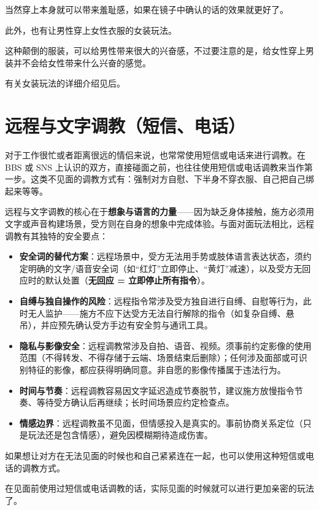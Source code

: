\documentclass[12pt,UTF8]{ctexbook}
\begin{document}
当然穿上本身就可以带来羞耻感，如果在镜子中确认的话的效果就更好了。

此外，也有让男性穿上女性衣服的女装玩法。

这种颠倒的服装，可以给男性带来很大的兴奋感，不过要注意的是，给女性穿上男装并不会给女性带来什么兴奋的感觉。

有关女装玩法的详细介绍见后。

\section{远程与文字调教（短信、电话）}

对于工作很忙或者距离很远的情侣来说，也常常使用短信或电话来进行调教。在 BBS 或 SNS 上认识的双方，直接碰面之前，也往往使用短信或电话调教来当作第一步。这类不见面的调教方式有：强制对方自慰、下半身不穿衣服、自己把自己绑起来等等。

远程与文字调教的核心在于\textbf{想象与语言的力量}——因为缺乏身体接触，施方必须用文字或声音构建场景，受方则在自身的想象中完成体验。与面对面玩法相比，远程调教有其独特的安全要点：

\begin{itemize}
\item \textbf{安全词的替代方案}：远程场景中，受方无法用手势或肢体语言表达状态，须约定明确的文字/语音安全词（如“红灯”立即停止、“黄灯”减速），以及受方无回应时的默认处置（\textbf{无回应 = 立即停止所有指令}）。
\item \textbf{自缚与独自操作的风险}：远程指令常涉及受方独自进行自缚、自慰等行为，此时无人监护——施方不应下达受方无法自行解除的指令（如复杂自缚、悬吊），并应预先确认受方手边有安全剪与通讯工具。
\item \textbf{隐私与影像安全}：远程调教常涉及自拍、语音、视频。须事前约定影像的使用范围（不得转发、不得存储于云端、场景结束后删除）；任何涉及面部或可识别特征的影像，都应获得明确同意。非自愿的影像传播属于违法行为。
\item \textbf{时间与节奏}：远程调教容易因文字延迟造成节奏脱节，建议施方放慢指令节奏、等待受方确认后再继续；长时间场景应约定检查点。
\item \textbf{情感边界}：远程调教虽不见面，但情感投入是真实的。事前协商关系定位（只是玩法还是包含情感），避免因模糊期待造成伤害。
\end{itemize}

如果想让对方在无法见面的时候也和自己紧紧连在一起，也可以使用这种短信或电话的调教方式。

在见面前使用过短信或电话调教的话，实际见面的时候就可以进行更加亲密的玩法了。
\end{document}
